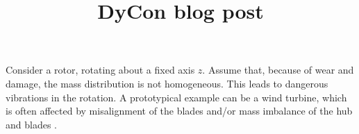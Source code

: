 \documentclass{aims}
\title[DyCon blog post] %
{DyCon blog post}
\theoremstyle{definition}
\begin{document}
	\maketitle
	
	
	Consider a rotor, rotating about a fixed axis $z$. Assume that, because of wear and damage, the mass distribution is not homogeneous. This leads to dangerous vibrations in the rotation. A prototypical example can be a wind turbine, which is often affected by misalignment of the blades and/or mass imbalance of the hub and blades \cite{jeffrey2012method}.
	
\end{document}
